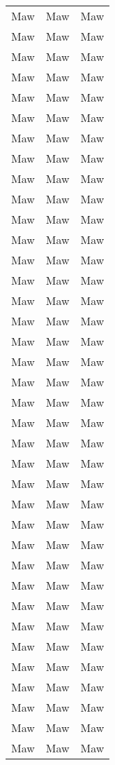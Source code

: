\documentclass[a4, 11pt]{article}
\begin{document}
\begin{longtable}{ l l l }
                Maw & Maw & Maw\\
                Maw & Maw & Maw\\
                Maw & Maw & Maw\\
                Maw & Maw & Maw\\
                Maw & Maw & Maw\\
                Maw & Maw & Maw\\
                Maw & Maw & Maw\\
                Maw & Maw & Maw\\
                Maw & Maw & Maw\\
                Maw & Maw & Maw\\
                Maw & Maw & Maw\\
                Maw & Maw & Maw\\
                Maw & Maw & Maw\\
                Maw & Maw & Maw\\
                Maw & Maw & Maw\\
                Maw & Maw & Maw\\
                Maw & Maw & Maw\\
                Maw & Maw & Maw\\
                Maw & Maw & Maw\\
                Maw & Maw & Maw\\
                Maw & Maw & Maw\\
                Maw & Maw & Maw\\
                Maw & Maw & Maw\\
                Maw & Maw & Maw\\
                Maw & Maw & Maw\\
                Maw & Maw & Maw\\
                Maw & Maw & Maw\\
                Maw & Maw & Maw\\
                Maw & Maw & Maw\\
                Maw & Maw & Maw\\
                Maw & Maw & Maw\\
                Maw & Maw & Maw\\
                Maw & Maw & Maw\\
                Maw & Maw & Maw\\
                Maw & Maw & Maw\\
                Maw & Maw & Maw\\
                Maw & Maw & Maw\\
	\end{longtable}
\end{document}
